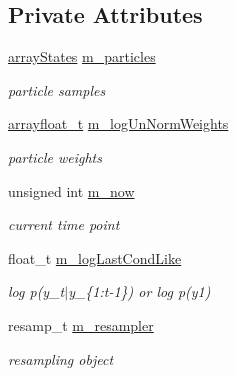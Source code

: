 \subsection*{Private Attributes}
\begin{DoxyCompactItemize}
\item 
\mbox{\label{classSISRFilter_a98c87c50c054354cdc85dc800ba15bdd}} 
\hyperlink{classSISRFilter_a5c8a38ceb31c22f3c3f38b0ead5c1ce7}{array\+States} \hyperlink{classSISRFilter_a98c87c50c054354cdc85dc800ba15bdd}{m\+\_\+particles}
\begin{DoxyCompactList}\small\item\em particle samples \end{DoxyCompactList}\item 
\mbox{\label{classSISRFilter_a99f63cbae203084cf3d812a61bb725fe}} 
\hyperlink{classSISRFilter_a35f5a590324bd78fc4f6ded236937ac2}{arrayfloat\+\_\+t} \hyperlink{classSISRFilter_a99f63cbae203084cf3d812a61bb725fe}{m\+\_\+log\+Un\+Norm\+Weights}
\begin{DoxyCompactList}\small\item\em particle weights \end{DoxyCompactList}\item 
\mbox{\label{classSISRFilter_a1aafd7da52826fd25967c8258f68ce9c}} 
unsigned int \hyperlink{classSISRFilter_a1aafd7da52826fd25967c8258f68ce9c}{m\+\_\+now}
\begin{DoxyCompactList}\small\item\em current time point \end{DoxyCompactList}\item 
\mbox{\label{classSISRFilter_a7031db4bd7d9c1db7ea83150893525ed}} 
float\+\_\+t \hyperlink{classSISRFilter_a7031db4bd7d9c1db7ea83150893525ed}{m\+\_\+log\+Last\+Cond\+Like}
\begin{DoxyCompactList}\small\item\em log p(y\+\_\+t$\vert$y\+\_\+\{1\+:t-\/1\}) or log p(y1) \end{DoxyCompactList}\item 
\mbox{\label{classSISRFilter_a46f945e550fab93eedddf10a69c251f1}} 
resamp\+\_\+t \hyperlink{classSISRFilter_a46f945e550fab93eedddf10a69c251f1}{m\+\_\+resampler}
\begin{DoxyCompactList}\small\item\em resampling object \end{DoxyCompactList}\item 

\end{DoxyCompactItemize}
